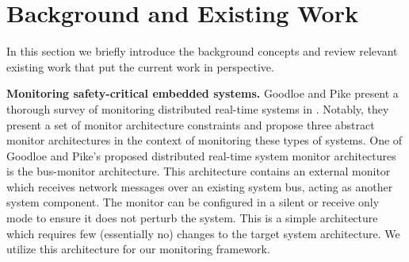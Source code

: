 
\section{Background and Existing Work}
In this section we briefly introduce the background concepts and review relevant existing work that put the current work in perspective.  

\textbf{Monitoring safety-critical embedded systems.}
Goodloe and Pike present a thorough survey of monitoring distributed real-time systems in \cite{Goodloe2010}. Notably, they present a set of monitor architecture constraints and propose three abstract monitor architectures in the context of monitoring these types of systems.
%
One of Goodloe and Pike's proposed distributed real-time system monitor architectures is the bus-monitor architecture.
This architecture contains an external monitor which receives network messages over an existing system bus, acting as another system component.
The monitor can be configured in a silent or receive only mode to ensure it does not perturb the system. 
This is a simple architecture which requires few (essentially no) changes to the target system architecture. We utilize this architecture for our monitoring framework. 

